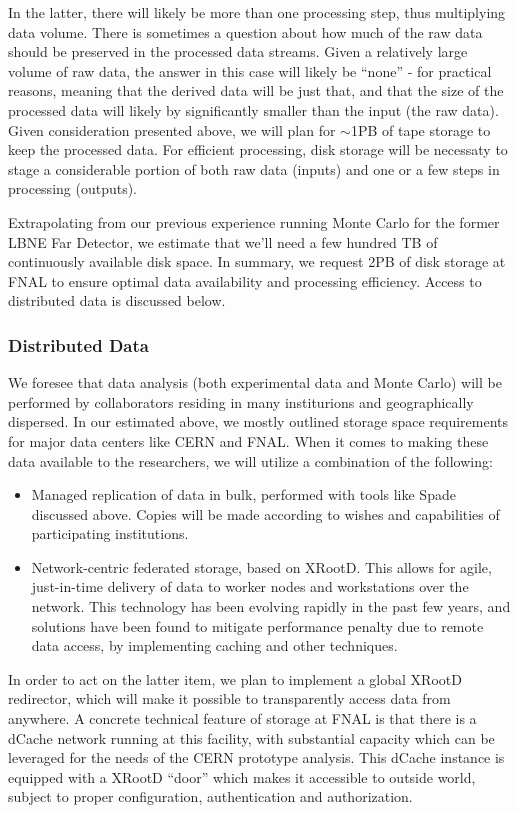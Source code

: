 In the latter, there will likely be more than one processing step, thus multiplying data volume. There is sometimes a question about how much of the raw data should be preserved in
the processed data streams. Given a relatively large volume of raw data, the answer in this case will likely be ``none'' - for practical reasons, meaning that the derived data will
be just that, and that the size of the processed data will likely by significantly smaller than the input (the raw data). Given consideration presented above, we will plan for
$\sim$1PB of tape storage to keep the processed data. For efficient processing, disk storage will be necessaty to stage a considerable portion of both raw data (inputs) and
one or a few steps in processing (outputs).

Extrapolating from our previous experience running Monte Carlo for the former LBNE Far Detector, we estimate that we'll need a few hundred TB of continuously available
disk space. In summary, we request 2PB of disk storage at FNAL to ensure optimal data availability and processing efficiency. Access to distributed data is discussed below.

\subsubsection{Distributed Data}
We foresee that data analysis (both experimental data and Monte Carlo) will be performed by collaborators residing in many institurions and geographically dispersed. In our
estimated above, we mostly outlined storage space requirements for major data centers like CERN and FNAL. When it comes to making these data available to the researchers,
we will utilize a combination of the following:
\begin{itemize}
\item Managed replication of data in bulk, performed with tools like Spade discussed above. Copies will be made according to wishes and capabilities of participating institutions.
\item Network-centric federated storage, based on XRootD. This allows for agile, just-in-time delivery of data to worker nodes and workstations over the network. This
technology has been evolving rapidly in the past few years, and solutions have been found to mitigate performance penalty due to remote data access, by implementing caching
and other techniques.
\end{itemize}

In order to act on the latter item, we plan to implement a global XRootD redirector, which will make it possible to transparently access data from anywhere.
A concrete technical feature of storage at FNAL is that there is a dCache network running at this facility, with substantial capacity which can be leveraged
for the needs of the CERN prototype analysis. This dCache instance is equipped with a XRootD ``door'' which makes it accessible to outside world, subject
to proper configuration, authentication and authorization.

